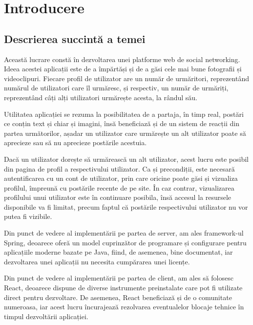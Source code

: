 \chapter{Introducere}
\section{Descrierea succintă a temei}

Această lucrare constă în dezvoltarea unei platforme web de social networking. Ideea acestei aplicații este de a împărtăși și de a găsi cele mai bune fotografii și videoclipuri. Fiecare profil de utilizator are un număr de urmăritori, reprezentând numărul de utilizatori care îl urmăresc, și respectiv, un număr de urmăriți, reprezentând câți alți utilizatori urmărește acesta, la rândul său.\newline

Utilitatea aplicației se rezuma la posibilitatea de a partaja, în timp real, postări ce conțin text și chiar și imagini, însă beneficiază și de un sistem de reacții din partea următorilor, așadar un utilizator care urmărește un alt utilizator poate să aprecieze sau să nu aprecieze postările acestuia.\newline

Dacă un utilizator dorește să urmărească un alt utilizator, acest lucru este posibil din pagina de profil a respectivului utilizator. Ca și precondiții, este necesară autentificarea cu un cont de utilizator, prin care oricine poate găsi și vizualiza profilul, împreună cu postările recente de pe site. În caz contrar, vizualizarea profilului unui utilizator este în continuare posibila, însă accesul la resursele disponibile va fi limitat, precum faptul că postările respectivului utilizator nu vor putea fi vizibile.\newline

Din punct de vedere al implementării pe partea de server, am ales framework-ul Spring\cite{.springdoc}, deoarece oferă un model cuprinzător de programare și configurare pentru aplicațiile moderne bazate pe Java, fiind, de asemenea, bine documentat, iar dezvoltarea unei aplicații nu necesita cumpărarea unei licențe.\newline

Din punct de vedere al implementării pe partea de client, am ales să folosesc React\cite{.reactdoc}, deoarece dispune de diverse instrumente preinstalate care pot fi utilizate direct pentru dezvoltare. De asemenea, React beneficiază și de o comunitate numeroasa, iar acest lucru încurajează rezolvarea eventualelor blocaje tehnice în timpul dezvoltării aplicației.

